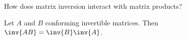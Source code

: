 

How does matrix inversion interact with matrix products?

\begin{proposition}
  Let $A$ and $B$ conforming invertible matrices.
  Then $\inv{AB} = \inv{B}\inv{A}$.
\end{proposition}

\blankpage

